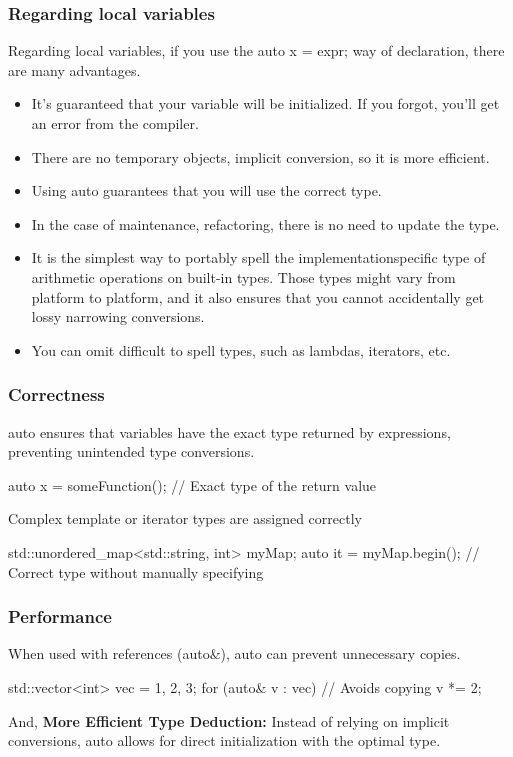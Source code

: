 \documentclass{report}
\begin{document}
 \subsubsection{Regarding local variables}
 \bigbreak \noindent 
 Regarding local variables, if you use the auto x = expr; way of declaration, there are many advantages.
 \begin{itemize}
     \item It’s guaranteed that your variable will be initialized. If you forgot, you’ll get an error from the compiler.
     \item There are no temporary objects, implicit conversion, so it is more efficient.
     \item Using auto guarantees that you will use the correct type.
     \item In the case of maintenance, refactoring, there is no need to update the type.
     \item It is the simplest way to portably spell the implementationspecific type of arithmetic operations on built-in types. Those types might vary from platform to platform, and it also ensures that you cannot accidentally get lossy narrowing conversions.
     \item You can omit difficult to spell types, such as lambdas, iterators, etc.
 \end{itemize}

 \bigbreak \noindent 
 \subsubsection{Correctness}
 \bigbreak \noindent 
 auto ensures that variables have the exact type returned by expressions, preventing unintended type conversions.
 \bigbreak \noindent 
 \begin{cppcode}
 auto x = someFunction(); // Exact type of the return value
 \end{cppcode}
 \bigbreak \noindent 
 Complex template or iterator types are assigned correctly
 \bigbreak \noindent 
 \begin{cppcode}
     std::unordered_map<std::string, int> myMap;
     auto it = myMap.begin(); // Correct type without manually specifying
 \end{cppcode}

 \bigbreak \noindent 
 \subsubsection{Performance}
 \bigbreak \noindent 
 When used with references (auto\&), auto can prevent unnecessary copies.
 \bigbreak \noindent 
 \begin{cppcode}
     std::vector<int> vec = {1, 2, 3};
     for (auto& v : vec) { // Avoids copying
         v *= 2;
     }
 \end{cppcode}
 \bigbreak \noindent 
 And, 
 \bigbreak \noindent 
 \textbf{More Efficient Type Deduction:} Instead of relying on implicit conversions, auto allows for direct initialization with the optimal type.
\end{document}

